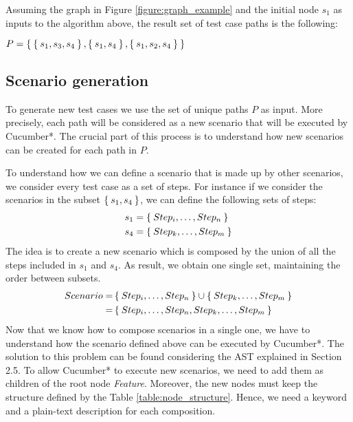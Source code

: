 Assuming the graph in Figure \ref{figure:graph_example} and the initial node $s_1$ as inputs to the algorithm above, the result set of test case paths is the following:
\begin{center}
$P = \Set{ \Set{s_1,s_3,s_4}, \Set{s_1,s_4}, \Set{s_1,s_2,s_4} }$ \nonumber
\end{center}

\newpage
\subsection{Scenario generation}

To generate new test cases we use the set of unique paths $P$ as input. More precisely, each path will be considered as a new scenario that will be executed by Cucumber*. The crucial part of this process is to understand how new scenarios can be created for each path in $P$.

To understand how we can define a scenario that is made up by other scenarios, we consider every test case as a set of steps. For instance if we consider the scenarios in the subset $\Set{s_1,s_4}$, we can define the following sets of steps:
\begin{align}
s_1 &= \Set{Step_i, \dots, Step_n} \nonumber \\
s_4 &= \Set{Step_k, \dots, Step_m} \nonumber
\end{align}
The idea is to create a new scenario which is composed by the union of all the steps included in $s_1$ and $s_4$. As result, we obtain one single set, maintaining the order between subsets.
\begin{align}
Scenario =& \Set{Step_i, \dots, Step_n} \cup \Set{Step_k, \dots, Step_m} \nonumber \\
=& \Set{Step_i, \dots, Step_n, Step_k, \dots, Step_m} \nonumber
\end{align}
Now that we know how to compose scenarios in a single one, we have to understand how the scenario defined above can be executed by Cucumber*. The solution to this problem can be found considering the AST explained in Section 2.5. To allow Cucumber* to execute new scenarios, we need to add them as children of the root node \textit{Feature}. Moreover, the new nodes must keep the structure defined by the Table \ref{table:node_structure}. Hence, we need a keyword and a plain-text description for each composition.

